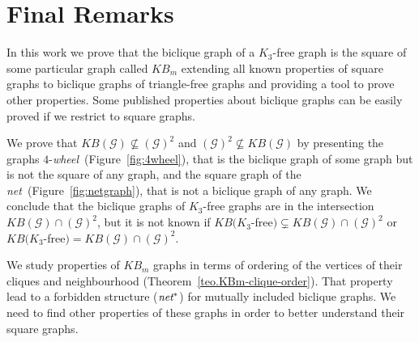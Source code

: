 \documentclass{article}
\newcommand{\margem}[2]
        {\mbox{}\marginpar{%
        \raggedright\textcolor{#2}{%
        \hspace{0pt}\bfseries\ssmall #1\\}}}
\newcommand{\comment}[3]{\margem{\textit{(#1)}\\ #3}{#2}}
\newcommand{\ag}[1]{\comment{AG}{blue}{#1}}
\newcommand{\mG}{\ensuremath{\mathcal{G}}}
\newcommand{\net}{\emph{net}}
\newcommand{\wheel}{\emph{wheel}}
\begin{document}
\section{Final Remarks}

In this work we prove that the biclique graph of a $K_3$-free graph is the square of
some particular graph called $KB_m$ extending all known properties of square graphs to biclique graphs of triangle-free graphs and providing a tool to prove other properties. Some published properties about biclique graphs can be easily proved if we restrict to square graphs.

We prove that      $KB(\mG)     \not\subseteq      (\mG)^2$      and $(\mG)^2  \not\subseteq KB(\mG)$ by presenting the graphs $4$-\wheel\ (Figure~\ref{fig:4wheel}),  that is
the biclique graph of some graph but  is not the square of any graph, and the square graph of  the \net\  (Figure~\ref{fig:netgraph}),  that is  not a  biclique graph  of any  graph. 
 We conclude that the  biclique  graphs of  $K_3$-free
graphs are  in the intersection  $KB(\mG) \cap  (\mG)^2$, but it  is not
known   if  $KB(K_3$-free$)   \subsetneq   KB(\mG)   \cap  (\mG)^2$   or
$KB(K_3$-free$) = KB(\mG) \cap (\mG)^2$. 


We study properties of $KB_m$ graphs  in terms of ordering  of the vertices of  their cliques and
neighbourhood  (Theorem~\ref{teo.KBm-clique-order}). That  property lead
to a forbidden structure ($\net^*$) for mutually included biclique graphs.
We need to find other
properties  of these  graphs in  order to  better understand  their square
graphs.


\end{document}
